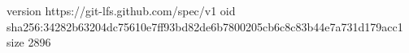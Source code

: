 version https://git-lfs.github.com/spec/v1
oid sha256:34282b63204dc75610e7ff93bd82de6b7800205cb6c8c83b44e7a731d179acc1
size 2896
